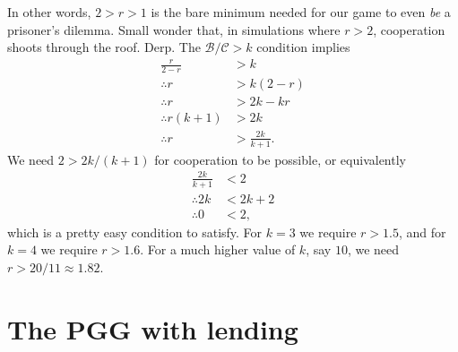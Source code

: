 \documentclass[13pt]{amsart}
\begin{document}
In other words, $2 > r > 1$ is the bare minimum needed for our game to even \emph{be} a prisoner's dilemma.
Small wonder that, in simulations where $r > 2$, cooperation shoots through the roof.
Derp.
The $\mathcal{B}/\mathcal{C} > k$ condition implies
\begin{equation}
    \begin{split}
        \frac{r}{2-r} & > k \\
        \therefore r & > k(2-r) \\
        \therefore r & > 2k - kr \\
        \therefore r(k+1) & > 2k \\
        \therefore r & > \frac{2k}{k+1}.
    \end{split}
\end{equation}
We need $2 > 2k/(k+1)$ for cooperation to be possible, or equivalently
\begin{equation}
    \begin{split}
        \frac{2k}{k+1} & < 2 \\
        \therefore 2k & < 2k + 2 \\
        \therefore 0 & < 2,
    \end{split}
\end{equation}
which is a pretty easy condition to satisfy.
For $k = 3$ we require $r > 1.5$, and for $k = 4$ we require $r > 1.6$.
For a much higher value of $k$, say $10$, we need $r > 20/11 \approx 1.82$.

\section{The PGG with lending}
\end{document}
